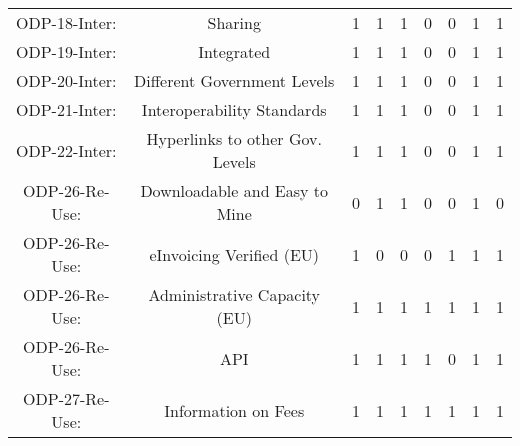 \documentclass[a4paper, twoside]{report}
\begin{document}
\begin{table}[htbp]
\begin{adjustbox}{max width=\linewidth}
\begin{tabular}{rcccccccc}
    \midrule
    \multicolumn{1}{c}{ODP-18-Inter:} & \multicolumn{1}{p{19em}}{Sharing} & 1     & 1     & 1     & 0     & 0     & 1     & 1 \\
    \multicolumn{1}{c}{ODP-19-Inter:} & \multicolumn{1}{p{19em}}{Integrated} & 1     & 1     & 1     & 0     & 0     & 1     & 1 \\
    \multicolumn{1}{c}{ODP-20-Inter:} & \multicolumn{1}{p{19em}}{Different Government Levels} & 1     & 1     & 1     & 0     & 0     & 1     & 1 \\
    \multicolumn{1}{c}{ODP-21-Inter:} & \multicolumn{1}{p{19em}}{\cellcolor[rgb]{ .749,  .749,  .749}Interoperability Standards} & \cellcolor[rgb]{ .749,  .749,  .749}1 & \cellcolor[rgb]{ .749,  .749,  .749}1 & \cellcolor[rgb]{ .749,  .749,  .749}1 & \cellcolor[rgb]{ .749,  .749,  .749}0 & \cellcolor[rgb]{ .749,  .749,  .749}0 & \cellcolor[rgb]{ .749,  .749,  .749}1 & \cellcolor[rgb]{ .749,  .749,  .749}1 \\
    \multicolumn{1}{c}{ODP-22-Inter:} & \multicolumn{1}{p{19em}}{\cellcolor[rgb]{ .749,  .749,  .749}Hyperlinks to other Gov. Levels} & \cellcolor[rgb]{ .749,  .749,  .749}1 & \cellcolor[rgb]{ .749,  .749,  .749}1 & \cellcolor[rgb]{ .749,  .749,  .749}1 & \cellcolor[rgb]{ .749,  .749,  .749}0 & \cellcolor[rgb]{ .749,  .749,  .749}0 & \cellcolor[rgb]{ .749,  .749,  .749}1 & \cellcolor[rgb]{ .749,  .749,  .749}1 \\
    \midrule
    \multicolumn{1}{c}{ODP-26-Re-Use:} & \multicolumn{1}{p{19em}}{Downloadable and Easy to Mine} & 0     & 1     & 1     & 0     & 0     & 1     & 0 \\
    \multicolumn{1}{c}{ODP-26-Re-Use:} & \multicolumn{1}{p{19em}}{\cellcolor[rgb]{ .749,  .749,  .749}eInvoicing Verified (EU)} & \cellcolor[rgb]{ .749,  .749,  .749}1 & \cellcolor[rgb]{ .749,  .749,  .749}0 & \cellcolor[rgb]{ .749,  .749,  .749}0 & \cellcolor[rgb]{ .749,  .749,  .749}0 & \cellcolor[rgb]{ .749,  .749,  .749}1 & \cellcolor[rgb]{ .749,  .749,  .749}1 & \cellcolor[rgb]{ .749,  .749,  .749}1 \\
    \multicolumn{1}{c}{ODP-26-Re-Use:} & \multicolumn{1}{p{19em}}{Administrative Capacity (EU)} & 1     & 1     & 1     & 1     & 1     & 1     & 1 \\
    \multicolumn{1}{c}{ODP-26-Re-Use:} & \multicolumn{1}{p{19em}}{API} & 1     & 1     & 1     & 1     & 0     & 1     & 1 \\
    \multicolumn{1}{c}{ODP-27-Re-Use:} & \multicolumn{1}{p{19em}}{\cellcolor[rgb]{ .749,  .749,  .749}Information on Fees} & \cellcolor[rgb]{ .749,  .749,  .749}1 & \cellcolor[rgb]{ .749,  .749,  .749}1 & \cellcolor[rgb]{ .749,  .749,  .749}1 & \cellcolor[rgb]{ .749,  .749,  .749}1 & \cellcolor[rgb]{ .749,  .749,  .749}1 & \cellcolor[rgb]{ .749,  .749,  .749}1 & \cellcolor[rgb]{ .749,  .749,  .749}1 \\

\end{tabular}
\end{adjustbox}
\end{table}
\end{document}
